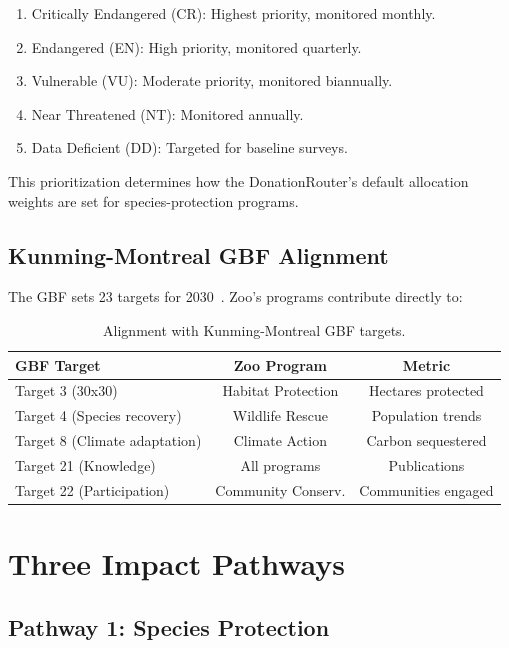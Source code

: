 \documentclass[11pt,letterpaper]{article}
\begin{document}
\begin{enumerate}
    \item Critically Endangered (CR): Highest priority, monitored monthly.
    \item Endangered (EN): High priority, monitored quarterly.
    \item Vulnerable (VU): Moderate priority, monitored biannually.
    \item Near Threatened (NT): Monitored annually.
    \item Data Deficient (DD): Targeted for baseline surveys.
\end{enumerate}

This prioritization determines how the DonationRouter's default allocation weights are set for species-protection programs.

\subsection{Kunming-Montreal GBF Alignment}

The GBF sets 23 targets for 2030~\cite{kmgbf2022}. Zoo's programs contribute directly to:

\begin{table}[t]
\centering
\begin{tabular}{lcc}
\toprule
\textbf{GBF Target} & \textbf{Zoo Program} & \textbf{Metric} \\
\midrule
Target 3 (30x30) & Habitat Protection & Hectares protected \\
Target 4 (Species recovery) & Wildlife Rescue & Population trends \\
Target 8 (Climate adaptation) & Climate Action & Carbon sequestered \\
Target 21 (Knowledge) & All programs & Publications \\
Target 22 (Participation) & Community Conserv. & Communities engaged \\
\bottomrule
\end{tabular}
\caption{Alignment with Kunming-Montreal GBF targets.}
\label{tab:gbf}
\end{table}

\section{Three Impact Pathways}
\label{sec:pathways}

\subsection{Pathway 1: Species Protection}
\end{document}
